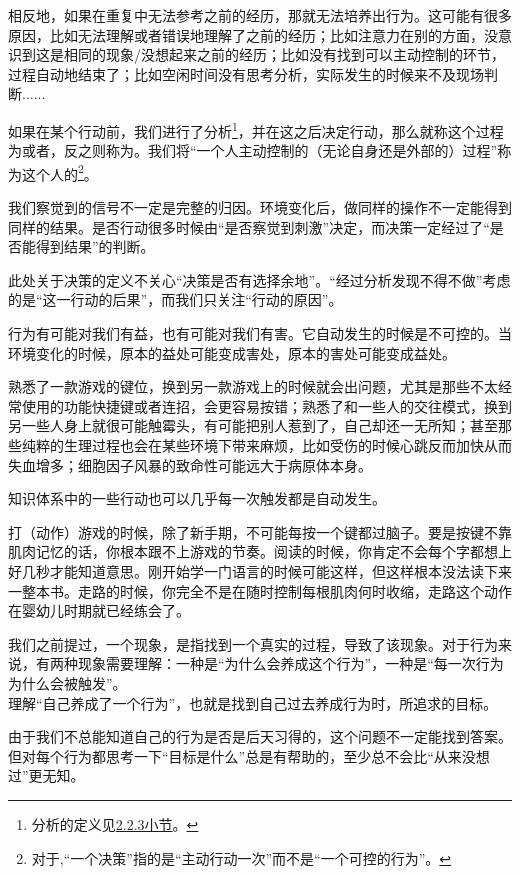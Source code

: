 \begin{examples}
相反地，如果在重复中无法参考之前的经历，那就无法培养出行为。这可能有很多原因，比如无法理解或者错误地理解了之前的经历；比如注意力在别的方面，没意识到这是相同的现象/没想起来之前的经历；比如没有找到可以主动控制的环节，过程自动地结束了；比如空闲时间没有思考分析，实际发生的时候来不及现场判断......
\end{examples}
如果在某个行动前，我们进行了分析\footnote{分析的定义见\hyperref[def:分析]{2.2.3小节}。}，并在这之后决定行动，那么就称这个过程为或者，反之则称为。我们将“一个人主动控制的（无论自身还是外部的）过程”称为这个人的\footnote{对于\rigorous,“一个决策”指的是“主动行动一次”而不是“一个可控的行为”。}。
\begin{explain}
我们察觉到的信号不一定是完整的归因。环境变化后，做同样的操作不一定能得到同样的结果。是否行动很多时候由“是否察觉到刺激”决定，而决策一定经过了“是否能得到结果”的判断。

此处关于决策的定义不关心“决策是否有选择余地”。“经过分析发现不得不做”考虑的是“这一行动的后果”，而我们只关注“行动的原因”。
\end{explain}
行为有可能对我们有益，也有可能对我们有害。它自动发生的时候是不可控的。当环境变化的时候，原本的益处可能变成害处，原本的害处可能变成益处。
\begin{examples}
熟悉了一款游戏的键位，换到另一款游戏上的时候就会出问题，尤其是那些不太经常使用的功能快捷键或者连招，会更容易按错；熟悉了和一些人的交往模式，换到另一些人身上就很可能触霉头，有可能把别人惹到了，自己却还一无所知；甚至那些纯粹的生理过程也会在某些环境下带来麻烦，比如受伤的时候心跳反而加快从而失血增多；细胞因子风暴的致命性可能远大于病原体本身。
\end{examples}
知识体系中的一些行动也可以几乎每一次触发都是自动发生。
\begin{examples}
打（动作）游戏的时候，除了新手期，不可能每按一个键都过脑子。要是按键不靠肌肉记忆的话，你根本跟不上游戏的节奏。阅读的时候，你肯定不会每个字都想上好几秒才能知道意思。刚开始学一门语言的时候可能这样，但这样根本没法读下来一整本书。走路的时候，你完全不是在随时控制每根肌肉何时收缩，走路这个动作在婴幼儿时期就已经练会了。
\end{examples}
我们之前提过，一个现象，是指找到一个真实的过程，导致了该现象。对于行为来说，有两种现象需要理解：一种是“为什么会养成这个行为”，一种是“每一次行为为什么会被触发”。\\
理解“自己养成了一个行为”，也就是找到自己过去养成行为时，所追求的目标。
\begin{explain}
由于我们不总能知道自己的行为是否是后天习得的，这个问题不一定能找到答案。但对每个行为都思考一下“目标是什么”总是有帮助的，至少总不会比“从来没想过”更无知。
\end{explain}
